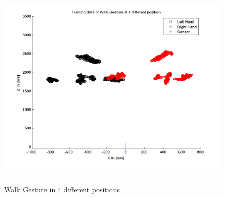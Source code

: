 \begin{figure}
	[h] \centering 
	\includegraphics[height=10cm]{figures/result/train-walk-all.jpg} \caption{Walk Gesture in 4 different positions} \label{pl:ges:pos} 
\end{figure}
